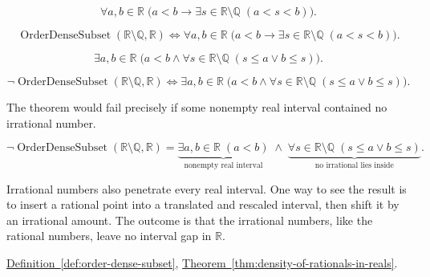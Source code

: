 \begin{remark*}
\[
\forall a,b\in\mathbb{R}\;\bigl(a<b\rightarrow \exists s\in\mathbb{R}\setminus\mathbb{Q}\;(a<s<b)\bigr).
\]
\end{remark*}

\begin{remark*}
\[
\operatorname{OrderDenseSubset}(\mathbb{R}\setminus\mathbb{Q},\mathbb{R})\Longleftrightarrow
\forall a,b\in\mathbb{R}\;\bigl(a<b\rightarrow \exists s\in\mathbb{R}\setminus\mathbb{Q}\;(a<s<b)\bigr).
\]
\end{remark*}

\begin{remark*}
\[
\exists a,b\in\mathbb{R}\;\bigl(a<b\land \forall s\in\mathbb{R}\setminus\mathbb{Q}\;(s\le a\lor b\le s)\bigr).
\]
\end{remark*}

\begin{remark*}
\[
\neg\operatorname{OrderDenseSubset}(\mathbb{R}\setminus\mathbb{Q},\mathbb{R})\Longleftrightarrow
\exists a,b\in\mathbb{R}\;\bigl(a<b\land \forall s\in\mathbb{R}\setminus\mathbb{Q}\;(s\le a\lor b\le s)\bigr).
\]
\end{remark*}

\begin{remark*}
The theorem would fail precisely if some nonempty real interval contained no irrational number.
\end{remark*}

\begin{remark*}
\[
\neg\operatorname{OrderDenseSubset}(\mathbb{R}\setminus\mathbb{Q},\mathbb{R})
=
\underbrace{\exists a,b\in\mathbb{R}\;(a<b)}_{\text{nonempty real interval}}
\;\land\;
\underbrace{\forall s\in\mathbb{R}\setminus\mathbb{Q}\;(s\le a\lor b\le s)}_{\text{no irrational lies inside}}.
\]
\end{remark*}

\begin{remark*}[Interpretation]
Irrational numbers also penetrate every real interval. One way to see the result is to insert a rational point into a translated and rescaled interval, then shift it by an irrational amount. The outcome is that the irrational numbers, like the rational numbers, leave no interval gap in $\mathbb{R}$.
\end{remark*}

\begin{remark*}[Dependencies]
\hyperref[def:order-dense-subset]{Definition~\ref*{def:order-dense-subset}},
\hyperref[thm:density-of-rationals-in-reals]{Theorem~\ref*{thm:density-of-rationals-in-reals}}.
\end{remark*}





